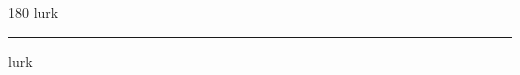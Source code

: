
\begin{frame}
\begin{center}
\begin{turn}{180}
{\fontsize{2.5cm}{1em}\selectfont lurk}
\end{turn}
\vspace{1em}\par  
\hrule
\vspace{1em}\par  
{\fontsize{2.5cm}{1em}\selectfont lurk}
\end{center}
\end{frame}
